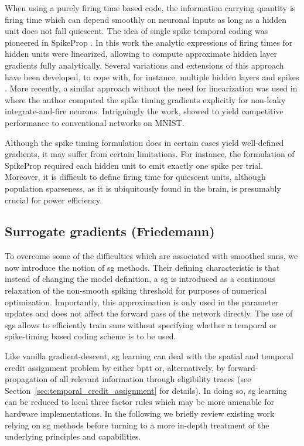 \documentclass[journal,onecolumn,11pt]{IEEEtran}
\begin{document}
When using a purely firing time based code, the information carrying quantity is
firing time which can depend smoothly on neuronal inputs as long as a hidden
unit does not fall quiescent.
The idea of single spike temporal coding was 
pioneered in SpikeProp \cite{bohte_error-backpropagation_2002}.
In this work the analytic expressions of firing times for hidden units 
were linearized, allowing to compute approximate hidden layer gradients fully
analytically. 
Several variations and extensions of this approach have been developed,
to cope with, for instance, multiple hidden layers and spikes
\cite{banerjee_learning_2016}. %
More recently, a similar approach without the need for linearization 
was used in \cite{Mostafa16_supelear} where the author computed the spike timing 
gradients explicitly for non-leaky integrate-and-fire neurons. 
Intriguingly the work, showed to yield competitive performance to conventional
networks on MNIST.

Although the spike timing formulation does in certain cases
yield well-defined gradients, it may suffer from certain
limitations. 
For instance, the formulation of SpikeProp required each hidden
unit to emit exactly one spike per trial. Moreover, it is difficult to define 
firing time for quiescent units, although population sparseness, as it is
ubiquitously found in the brain, is presumably crucial for power
efficiency.


\subsection{Surrogate gradients (Friedemann)}

To overcome some of the difficulties which are associated with smoothed \glspl{snn}, we now introduce the notion of \gls{sg} methods.
Their defining characteristic is that instead of changing the model definition, a \gls{sg} is introduced as a continuous relaxation of the non-smooth spiking threshold for purposes of numerical optimization.
Importantly, this approximation is only used in the parameter updates and does not affect the forward pass of the network directly.
The use of \glspl{sg} allows to efficiently train \glspl{snn} without specifying whether a temporal or spike-timing based coding scheme is to be used. 

Like vanilla gradient-descent, \gls{sg} learning can deal with the spatial and temporal credit assignment problem by either \gls{bptt} or, alternatively, by forward-propagation of all relevant information through eligibility traces (see Section~\ref{sec:temporal_credit_assignment} for details). 
In doing so, \gls{sg} learning can be reduced to local three factor rules which may be more amenable for hardware implementations. 
In the following we briefly review existing work relying on \gls{sg} methods before turning to a more in-depth treatment of the underlying principles and capabilities. 
\end{document}
